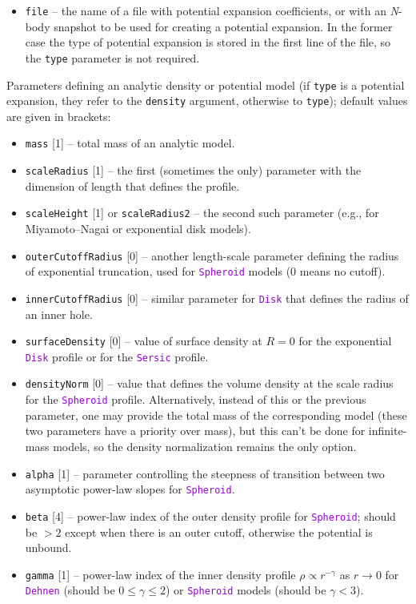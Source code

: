 \documentclass[12pt]{article}
\newcommand{\Nbody}{\textsl{N}-body\xspace}
\newcommand{\ttt}[1]{\textcolor{darkviolet}{\texttt{#1}}}
\newcommand{\ppp}[1]{\textcolor{darkolive} {\texttt{#1}}}
\begin{document}
\begin{itemize}
\item \ppp{file} -- the name of a file with potential expansion coefficients, or with an \Nbody snapshot to be used for creating a potential expansion. In the former case the type of potential expansion is stored in the first line of the file, so the \ppp{type} parameter is not required.
\end{itemize}
Parameters defining an analytic density or potential model (if \ppp{type} is a potential expansion, they refer to the \ppp{density} argument, otherwise to \ppp{type}); default values are given in brackets:
\begin{itemize}
\item \ppp{mass} [1] -- total mass of an analytic model.
\item \ppp{scaleRadius} [1] -- the first (sometimes the only) parameter with the dimension of length that defines the profile.
\item \ppp{scaleHeight} [1] or \ppp{scaleRadius2} -- the second such parameter (e.g., for Miyamoto--Nagai or exponential disk models).
\item \ppp{outerCutoffRadius} [0] -- another length-scale parameter defining the radius of exponential truncation, used for \ttt{Spheroid} models (0 means no cutoff).
\item \ppp{innerCutoffRadius} [0] -- similar parameter for \ttt{Disk} that defines the radius of an inner hole.
\item \ppp{surfaceDensity} [0] -- value of surface density at $R=0$ for the exponential \ttt{Disk} profile or for the \ttt{Sersic} profile.
\item \ppp{densityNorm} [0] -- value that defines the volume density at the scale radius for the \ttt{Spheroid} profile. Alternatively, instead of this or the previous parameter, one may provide the total mass of the corresponding model (these two parameters have a priority over mass), but this can't be done for infinite-mass models, so the density normalization remains the only option.
\item \ppp{alpha} [1] -- parameter controlling the steepness of transition between two asymptotic power-law slopes for \ttt{Spheroid}.
\item \ppp{beta} [4] -- power-law index of the outer density profile for \ttt{Spheroid}; should be $>2$ except when there is an outer cutoff, otherwise the potential is unbound.
\item \ppp{gamma} [1] -- power-law index of the inner density profile $\rho \propto r^{-\gamma}$ as $r\to 0$ for \ttt{Dehnen} (should be $0\le\gamma\le 2$) or \ttt{Spheroid} models (should be $\gamma<3$).

\end{itemize}
\end{document}
